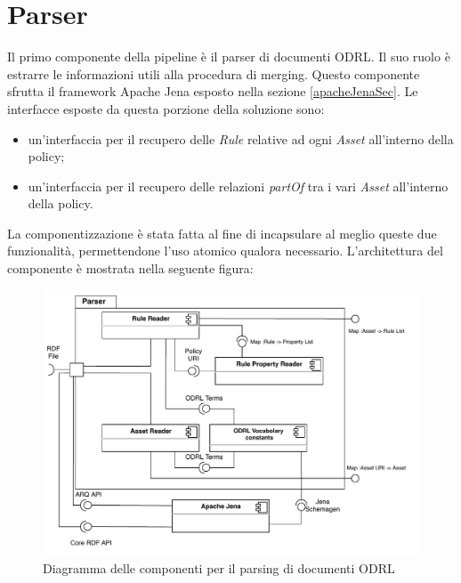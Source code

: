 \documentclass[12pt,a4paper,twoside]{book}
\begin{document}
\section{Parser}\label{parsingSection}
Il primo componente della pipeline è il parser di documenti ODRL. Il suo ruolo è estrarre le informazioni utili alla procedura di merging. Questo componente sfrutta il framework Apache Jena esposto nella sezione \ref{apacheJenaSec}. Le interfacce esposte da questa porzione della soluzione sono:
\begin{itemize}
\item un'interfaccia per il recupero delle \textit{Rule} relative ad ogni \textit{Asset} all'interno della policy;
\item un'interfaccia per il recupero delle relazioni \textit{partOf} tra i vari \textit{Asset} all'interno della policy.
\end{itemize}
La componentizzazione è stata fatta al fine di incapsulare al meglio queste due funzionalità, permettendone l'uso atomico qualora necessario. L'architettura del componente è mostrata nella seguente figura:
\begin{figure}[H]
\centering
\includegraphics[scale=.80]{../immagini/parserDiagram.pdf}
\caption{Diagramma delle componenti per il parsing di documenti ODRL}
\label{parserUML}
\end{figure}
\end{document}
